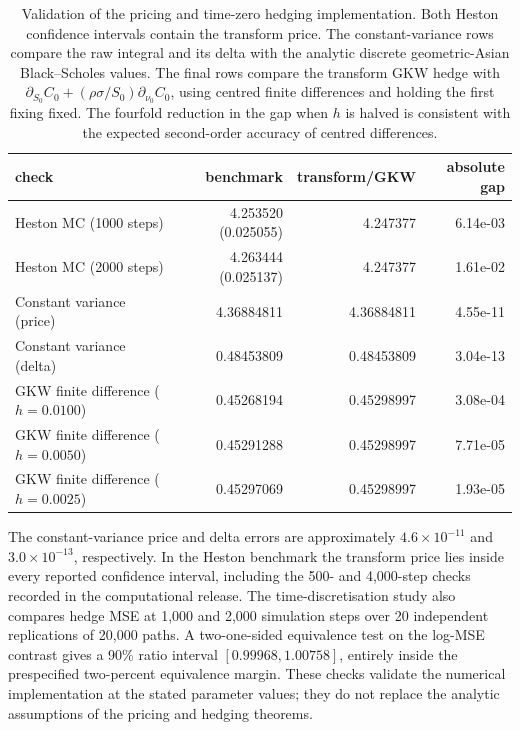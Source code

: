 \documentclass[10pt,a4paper,reqno]{amsart}
\theoremstyle{plain}
\theoremstyle{definition}
\theoremstyle{remark}
\theoremstyle{example}
\begin{document}
\begin{table}[htbp]
\centering
 \small
\begin{tabular}{lrrr}
\toprule
check &  benchmark &  transform/GKW &  absolute gap \\
 \midrule
Heston MC (1000 steps) & 4.253520 (0.025055) & 4.247377 & 6.14e-03 \\
Heston MC (2000 steps) & 4.263444 (0.025137) & 4.247377 & 1.61e-02 \\
Constant variance (price) & 4.36884811 & 4.36884811 & 4.55e-11 \\
Constant variance (delta) & 0.48453809 & 0.48453809 & 3.04e-13 \\
GKW finite difference ($h=0.0100$) & 0.45268194 & 0.45298997 & 3.08e-04 \\
GKW finite difference ($h=0.0050$) & 0.45291288 & 0.45298997 & 7.71e-05 \\
GKW finite difference ($h=0.0025$) & 0.45297069 & 0.45298997 & 1.93e-05 \\
\bottomrule
\end{tabular}
\caption{Validation of the pricing and time-zero hedging implementation. Both Heston confidence
intervals contain the transform price. The constant-variance rows compare the raw integral and its delta with the analytic discrete geometric-Asian Black--Scholes values. The final rows compare the transform GKW hedge with \(\partial_{S_0}C_0+(\rho\sigma/S_0)\partial_{\nu_0}C_0\), using centred finite differences and holding the first fixing fixed. The fourfold reduction in the gap when \(h\) is halved is consistent with the expected second-order accuracy of centred differences.}
 \label{tab:pricing-primary-validation}
\end{table}

 The constant-variance price and delta errors are approximately \(4.6\times10^{-11}\) and
\(3.0\times10^{-13}\), respectively. In the Heston benchmark the
transform price lies inside every reported confidence interval, including the 500- and 4,000-step
checks recorded in the computational release.  The time-discretisation study also compares hedge
MSE at 1,000 and 2,000 simulation steps over 20 independent replications of 20,000 paths.  A
two-one-sided equivalence test on the log-MSE contrast gives a 90\% ratio interval
\([0.99968,1.00758]\), entirely inside the prespecified two-percent equivalence margin.  These
checks validate the numerical implementation at the stated parameter values; they do not replace
the analytic assumptions of the pricing and hedging theorems.
\end{document}
